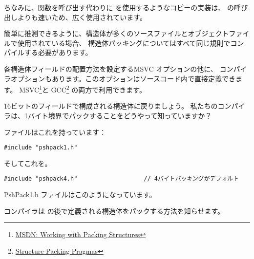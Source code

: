 ちなみに、関数を呼び出す代わりに \MOV を使用するようなコピーの実装は、
の呼び出しよりも速いため、広く使用されています。

簡単に推測できるように、構造体が多くのソースファイルとオブジェクトファイルで使用されている場合、
構造体パッキングについてはすべて同じ規則でコンパイルする必要があります。

\newcommand{\FNURLMSDNZP}{\footnote{\href{http://go.yurichev.com/17067}
{MSDN: Working with Packing Structures}}}
\newcommand{\FNURLGCCPC}{\footnote{\href{http://go.yurichev.com/17068}
{Structure-Packing Pragmas}}}

各構造体フィールドの配置方法を設定するMSVC オプションの他に、
コンパイラオプションもあります。このオプションはソースコード内で直接定義できます。 
MSVC\FNURLMSDNZP と GCC\FNURLGCCPC{} の両方で利用できます。

16ビットのフィールドで構成される構造体に戻りましょう。
私たちのコンパイラは、1バイト境界でパックすることをどうやって知っていますか？

ファイルはこれを持っています：

\begin{lstlisting}[caption=WinNT.h,style=customc]
#include "pshpack1.h"
\end{lstlisting}

そしてこれを。

\begin{lstlisting}[caption=WinNT.h,style=customc]
#include "pshpack4.h"                   // 4バイトパッキングがデフォルト
\end{lstlisting}

PshPack1.h ファイルはこのようになっています。



コンパイラは  の後で定義される構造体をパックする方法を知らせます。


